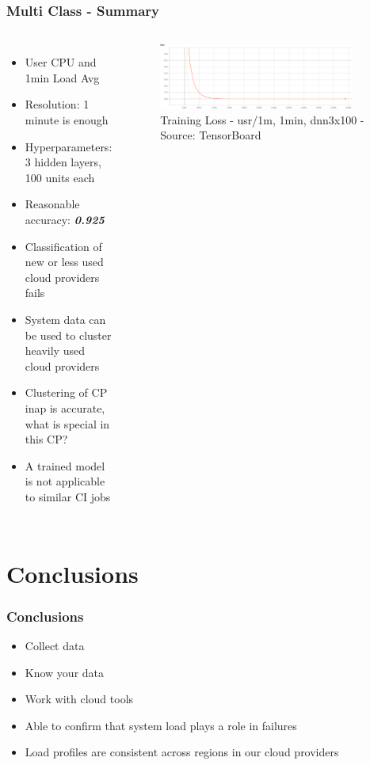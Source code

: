 \documentclass[aspectratio=169,11pt,hyperref={colorlinks=true}]{beamer}
\begin{document}
\begin{frame}
    \frametitle{Multi Class - Summary}
    \begin{columns}
        \begin{itemize}
            \item{User CPU and 1min Load Avg}
            \item{Resolution: 1 minute is enough}
            \item{Hyperparameters: 3 hidden layers, 100 units each}
            \item{Reasonable accuracy: \emph{\textbf{0.925}}}
            \item{Classification of new or less used cloud providers fails}
            \item{System data can be used to cluster heavily used cloud providers}
            \item{Clustering of CP inap is accurate, what is special in this CP?}
            \item{A trained model is not applicable to similar CI jobs}
        \end{itemize}
        \begin{figure}
          \begin{center}
            \includegraphics[width=0.9\textwidth,height=0.5\textheight]{graphs/cpu_1m-1min-dnn3x100-node_provider-loss_curve.png}
              \caption{Training Loss - usr/1m, 1min, dnn3x100 - Source: TensorBoard}
          \end{center}
        \end{figure}
      \end{columns}
\end{frame}

\section{Conclusions}
\begin{frame}
  \frametitle{Conclusions}
  \begin{itemize}
      \item{Collect data}
      \item{Know your data}
      \item{Work with cloud tools}
      \item Able to confirm that system load plays a role in failures
      \item Load profiles are consistent across regions in our cloud providers
    \end{itemize}
\end{frame}
\end{document}
